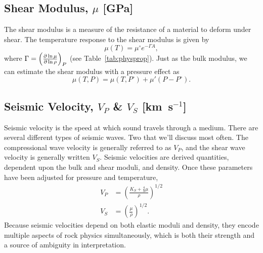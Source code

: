 \subsection{Shear Modulus, $\mu$ [GPa]} \label{sec:shear_modulus}
The shear modulus is a measure of the resistance of a material to deform under
shear.  The temperature response to the shear modulus is given by
\begin{equation}
    \mu(T) = \mu^\circ e^{-\Gamma A},
\end{equation}
where $\Gamma = \left( \pdv{\ln \mu}{\ln \rho} \right)_P$ (see
Table~\ref{tab:physprop}).  Just as the bulk modulus, we can estimate the shear
modulus with a pressure effect as
\begin{equation}
    \mu(T,P) = \mu(T,P^\circ) + \mu'(P - P^\circ) .
\end{equation}

\subsection{Seismic Velocity, $V_P$ \& $V_S$ [km~s$^{-1}$]} \label{sec:velocity}
Seismic velocity is the speed at which sound travels through a medium.  There
are several different types of seismic waves.  Two that we'll discuss most
often.  The compressional wave velocity is generally referred to as $V_P$, and
the shear wave velocity is generally written $V_S$.  Seismic velocities are
derived quantities, dependent upon the bulk and shear moduli, and density.  Once
these parameters have been adjusted for pressure and temperature,
\begin{align}
    V_P &= \left( \frac{K_S + \frac{4}{3} \mu}{\rho} \right)^{1/2} \\
    V_S &= \left( \frac{\mu}{\rho} \right)^{1/2} .
\end{align}
Because seismic velocities depend on both elastic moduli and density, they encode
multiple aspects of rock physics simultaneously, which is both their strength and a
source of ambiguity in interpretation.


